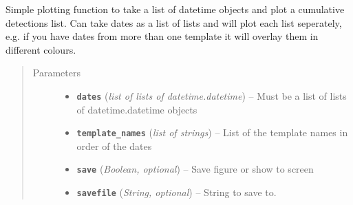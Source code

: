 \documentclass[a4paper,10pt,english]{sphinxmanual}
\begin{document}
\begin{fulllineitems}
\label{submodules/utils.EQcorrscan_plotting:EQcorrscan_plotting.cumulative_detections}
Simple plotting function to take a list of datetime objects and plot
a cumulative detections list.  Can take dates as a list of lists and will
plot each list seperately, e.g. if you have dates from more than one
template it will overlay them in different colours.
\begin{quote}\begin{description}
\item[{Parameters}] \leavevmode\begin{itemize}
\item {} 
\textbf{\texttt{dates}} (\emph{list of lists of datetime.datetime}) -- Must be a list of lists of datetime.datetime objects

\item {} 
\textbf{\texttt{template\_names}} (\emph{list of strings}) -- List of the template names in order of the dates

\item {} 
\textbf{\texttt{save}} (\emph{Boolean, optional}) -- Save figure or show to screen

\item {} 
\textbf{\texttt{savefile}} (\emph{String, optional}) -- String to save to.

\end{itemize}

\end{description}\end{quote}

\end{fulllineitems}

\end{document}
